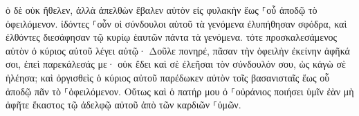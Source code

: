 \documentclass{openreader}
\begin{document}
ὁ δὲ οὐκ ἤθελεν, ἀλλὰ ἀπελθὼν ἔβαλεν αὐτὸν εἰς φυλακὴν ἕως ⸀οὗ ἀποδῷ τὸ ὀφειλόμενον. 
ἰδόντες ⸀οὖν οἱ σύνδουλοι αὐτοῦ τὰ γενόμενα ἐλυπήθησαν σφόδρα, καὶ ἐλθόντες διεσάφησαν τῷ κυρίῳ ἑαυτῶν πάντα τὰ γενόμενα. 
τότε προσκαλεσάμενος αὐτὸν ὁ κύριος αὐτοῦ λέγει αὐτῷ· Δοῦλε πονηρέ, πᾶσαν τὴν ὀφειλὴν ἐκείνην ἀφῆκά σοι, ἐπεὶ παρεκάλεσάς με· 
οὐκ ἔδει καὶ σὲ ἐλεῆσαι τὸν σύνδουλόν σου, ὡς κἀγὼ σὲ ἠλέησα; 
καὶ ὀργισθεὶς ὁ κύριος αὐτοῦ παρέδωκεν αὐτὸν τοῖς βασανισταῖς ἕως οὗ ἀποδῷ πᾶν τὸ ⸀ὀφειλόμενον. 
Οὕτως καὶ ὁ πατήρ μου ὁ ⸀οὐράνιος ποιήσει ὑμῖν ἐὰν μὴ ἀφῆτε ἕκαστος τῷ ἀδελφῷ αὐτοῦ ἀπὸ τῶν καρδιῶν ⸀ὑμῶν. 
\end{document}
